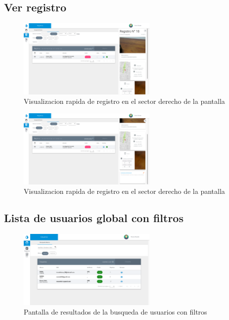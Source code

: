 \begin{itemize}
				\subsection{Ver registro}
					\begin{figure}
						\centering
							\includegraphics[width=0.6\textwidth]{Screenshots/web/registroVer1.png}
									\caption{Visualizacion rapida de registro en el sector derecho de la pantalla}
							\label{fig:verRegistro}
					\end{figure}
					\begin{figure}
						\centering
							\includegraphics[width=0.6\textwidth]{Screenshots/web/registroVer2.png}
									\caption{Visualizacion rapida de registro en el sector derecho de la pantalla}
							\label{fig:verRegistro}
					\end{figure}

				\subsection{Lista de usuarios global con filtros}
					\begin{figure}
						\centering
							\includegraphics[width=0.6\textwidth]{Screenshots/web/usuarioListar.png}
									\caption{Pantalla de resultados de la busqueda de usuarios con filtros}
							\label{fig:busqueda}
					\end{figure}


\end{itemize}
